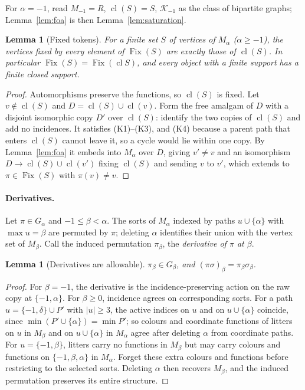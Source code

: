 \documentclass[11pt]{article}
\newtheorem{lemma}[theorem]{Lemma}
\theoremstyle{definition}
\theoremstyle{remark}
\newcommand{\Fix}{\operatorname{Fix}}
\newcommand{\cl}{\operatorname{cl}}
\newcommand{\calK}{\mathcal K}
\begin{document}
For \(\alpha=-1\), read \(M_{-1}=R\), \(\cl(S)=S\), \(\calK_{-1}\) as the
class of bipartite graphs; Lemma~\ref{lem:foa} is then
Lemma~\ref{lem:saturation}.

\begin{lemma}[Fixed tokens]\label{lem:fixed}
For a finite set \(S\) of vertices of \(M_\alpha\) (\(\alpha\geq-1\)),
the vertices fixed by every element of \(\Fix(S)\) are exactly those of
\(\cl(S)\). In particular \(\Fix(S)=\Fix(\cl S)\), and every object with a
finite support has a finite closed support.
\end{lemma}
\begin{proof}
Automorphisms preserve the functions, so \(\cl(S)\) is fixed. Let \(v\notin
\cl(S)\) and \(D=\cl(S)\cup\cl(v)\). Form the free amalgam of \(D\) with a
disjoint isomorphic copy \(D'\) over \(\cl(S)\): identify the two copies of
\(\cl(S)\) and add no incidences. It satisfies (K1)--(K3), and (K4) because
a parent path that enters \(\cl(S)\) cannot leave it, so a cycle would lie
within one copy. By Lemma~\ref{lem:foa} it embeds into \(M_\alpha\) over
\(D\), giving \(v'\neq v\) and an isomorphism \(D\to\cl(S)\cup\cl(v')\)
fixing \(\cl(S)\) and sending \(v\) to \(v'\), which extends to
\(\pi\in\Fix(S)\) with \(\pi(v)\neq v\).
\end{proof}

\paragraph{Derivatives.}
Let \(\pi\in G_\alpha\) and \(-1\leq\beta<\alpha\). The sorts of
\(M_\alpha\) indexed by paths \(u\cup\{\alpha\}\) with \(\max u=\beta\) are
permuted by \(\pi\); deleting \(\alpha\) identifies their union with the
vertex set of \(M_\beta\). Call the induced permutation \(\pi_\beta\), the
\emph{derivative of \(\pi\) at \(\beta\)}.

\begin{lemma}[Derivatives are allowable]\label{lem:derivative}
\(\pi_\beta\in G_\beta\), and \((\pi\sigma)_\beta=\pi_\beta\sigma_\beta\).
\end{lemma}
\begin{proof}
For \(\beta=-1\), the derivative is the incidence-preserving action on
the raw copy at \(\{-1,\alpha\}\). For \(\beta\geq0\), incidence
agrees on corresponding sorts. For a path \(u=\{-1,\delta\}\cup
P'\) with \(|u|\geq3\), the active indices on \(u\) and on \(u\cup\{
\alpha\}\) coincide, since \(\min(P'\cup\{\alpha\})=\min P'\); so colours
and coordinate functions of litters on \(u\) in \(M_\beta\) and on
\(u\cup\{\alpha\}\) in \(M_\alpha\) agree after deleting \(\alpha\) from
coordinate paths. For \(u=\{-1,\beta\}\), litters carry no functions in
\(M_\beta\) but may carry colours and functions on \(\{-1,\beta,\alpha\}\)
in \(M_\alpha\). Forget these extra colours and functions before
restricting to the selected sorts. Deleting \(\alpha\) then recovers
\(M_\beta\), and the induced permutation preserves its entire structure.
\end{proof}
\end{document}
